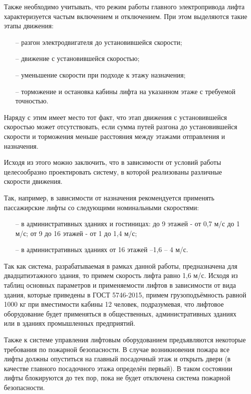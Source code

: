 	Также необходимо учитывать, что режим работы главного электропривода лифта характеризуется частым включением и отключением. При этом выделяются такие этапы движения:
		\begin{itemize}
			\item[--] разгон электродвигателя до установившейся скорости;
			\item[--] движение с установившейся скоростью;
			\item[--] уменьшение скорости при подходе к этажу назначения;
			\item[--] торможение и остановка кабины лифта на указанном этаже с требуемой точностью.
		\end{itemize}
	
	Наряду с этим имеет место тот факт, что этап движения с установившейся скоростью может отсутствовать, если сумма путей разгона до установившейся скорости и торможения меньше расстояния между этажами отправления и назначения.

	Исходя из этого можно заключить, что в зависимости от условий работы целесообразно проектировать систему, в которой реализованы различные скорости движения.
	
			Так, например, в зависимости от назначения рекомендуется применять пассажирские лифты со следующими номинальными скоростями:
		\begin{itemize}
			\item[--] в административных зданиях и гостиницах: до 9 этажей - от 0,7 м/с до 1 м/с; от 9 до 16 этажей - от 1 до 1,4 м/с;
			\item[--] в административных зданиях от 16 этажей –1,6 – 4 м/с.
		\end{itemize}
	
	Так как система, разрабатываемая в рамках данной работы, предназначена для двадцатиэтажного здания, то примем скорость лифта равно 1,6 м/с. Исходя из таблиц основных параметров и применяемости лифтов в зависимости от вида здания, которые приведены в ГОСТ 5746-2015, примем грузоподъёмность равной 1000 кг при вместимости кабины 12 человек, подразумевая, что лифтовое оборудование будет применяться в общественных, административных зданиях или в зданиях промышленных предприятий.
	
	Также к системе управления лифтовым оборудованием предъявляются некоторые требования по пожарной безопасности. В случае возникновения пожара все лифты должны опуститься на главный посадочный этаж и открыть двери (в качестве главного посадочного этажа определён первый). В таком состоянии лифты блокируются до тех пор, пока не будет отключена система пожарной безопасности.
